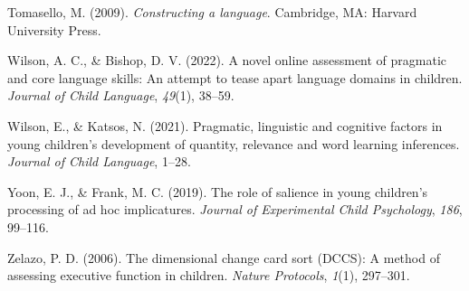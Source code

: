 \documentclass[
  english,
  man,floatsintext]{apa6}
\newlength{\cslhangindent}
\newlength{\cslentryspacingunit} %
\newenvironment{CSLReferences}[2] %
 {%
  \setlength{\parindent}{0pt}
  \ifodd #1
  \let\oldpar\par
  \def\par{\hangindent=\cslhangindent\oldpar}
  \fi
  \setlength{\parskip}{#2\cslentryspacingunit}
 }%
 {}
\begin{document}
\begin{CSLReferences}{1}{0}
\leavevmode{}%
Tomasello, M. (2009). \emph{Constructing a language}. Cambridge, MA: Harvard University Press.

\leavevmode{}%
Wilson, A. C., \& Bishop, D. V. (2022). A novel online assessment of pragmatic and core language skills: An attempt to tease apart language domains in children. \emph{Journal of Child Language}, \emph{49}(1), 38--59.

\leavevmode{}%
Wilson, E., \& Katsos, N. (2021). Pragmatic, linguistic and cognitive factors in young children's development of quantity, relevance and word learning inferences. \emph{Journal of Child Language}, 1--28.

\leavevmode{}%
Yoon, E. J., \& Frank, M. C. (2019). The role of salience in young children's processing of ad hoc implicatures. \emph{Journal of Experimental Child Psychology}, \emph{186}, 99--116.

\leavevmode{}%
Zelazo, P. D. (2006). The dimensional change card sort (DCCS): A method of assessing executive function in children. \emph{Nature Protocols}, \emph{1}(1), 297--301.

\end{CSLReferences}

\endgroup
\end{document}
